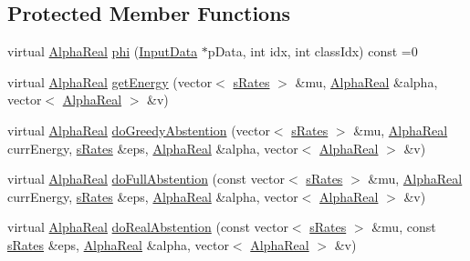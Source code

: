 \subsection*{Protected Member Functions}
\begin{DoxyCompactItemize}
\item 
virtual \hyperlink{Defaults_8h_a80184c4fd10ab70a1a17c5f97dcd1563}{Alpha\-Real} \hyperlink{classMultiBoost_1_1AbstainableLearner_a76d59e5c6678f43a3f483064beb06f64}{phi} (\hyperlink{classMultiBoost_1_1InputData}{Input\-Data} $\ast$p\-Data, int idx, int class\-Idx) const =0
\item 
virtual \hyperlink{Defaults_8h_a80184c4fd10ab70a1a17c5f97dcd1563}{Alpha\-Real} \hyperlink{classMultiBoost_1_1AbstainableLearner_ae0a99b6a9658f9dd66d55f3b47609675}{get\-Energy} (vector$<$ \hyperlink{structMultiBoost_1_1sRates}{s\-Rates} $>$ \&mu, \hyperlink{Defaults_8h_a80184c4fd10ab70a1a17c5f97dcd1563}{Alpha\-Real} \&alpha, vector$<$ \hyperlink{Defaults_8h_a80184c4fd10ab70a1a17c5f97dcd1563}{Alpha\-Real} $>$ \&v)
\item 
virtual \hyperlink{Defaults_8h_a80184c4fd10ab70a1a17c5f97dcd1563}{Alpha\-Real} \hyperlink{classMultiBoost_1_1AbstainableLearner_a022edc8c1b04c21720f56c0562db10a7}{do\-Greedy\-Abstention} (vector$<$ \hyperlink{structMultiBoost_1_1sRates}{s\-Rates} $>$ \&mu, \hyperlink{Defaults_8h_a80184c4fd10ab70a1a17c5f97dcd1563}{Alpha\-Real} curr\-Energy, \hyperlink{structMultiBoost_1_1sRates}{s\-Rates} \&eps, \hyperlink{Defaults_8h_a80184c4fd10ab70a1a17c5f97dcd1563}{Alpha\-Real} \&alpha, vector$<$ \hyperlink{Defaults_8h_a80184c4fd10ab70a1a17c5f97dcd1563}{Alpha\-Real} $>$ \&v)
\item 
virtual \hyperlink{Defaults_8h_a80184c4fd10ab70a1a17c5f97dcd1563}{Alpha\-Real} \hyperlink{classMultiBoost_1_1AbstainableLearner_a08b11f234d6f857343432a7f6c2d0c03}{do\-Full\-Abstention} (const vector$<$ \hyperlink{structMultiBoost_1_1sRates}{s\-Rates} $>$ \&mu, \hyperlink{Defaults_8h_a80184c4fd10ab70a1a17c5f97dcd1563}{Alpha\-Real} curr\-Energy, \hyperlink{structMultiBoost_1_1sRates}{s\-Rates} \&eps, \hyperlink{Defaults_8h_a80184c4fd10ab70a1a17c5f97dcd1563}{Alpha\-Real} \&alpha, vector$<$ \hyperlink{Defaults_8h_a80184c4fd10ab70a1a17c5f97dcd1563}{Alpha\-Real} $>$ \&v)
\item 
virtual \hyperlink{Defaults_8h_a80184c4fd10ab70a1a17c5f97dcd1563}{Alpha\-Real} \hyperlink{classMultiBoost_1_1AbstainableLearner_a04438bf3df3599fe42ca26771b6b2aff}{do\-Real\-Abstention} (const vector$<$ \hyperlink{structMultiBoost_1_1sRates}{s\-Rates} $>$ \&mu, const \hyperlink{structMultiBoost_1_1sRates}{s\-Rates} \&eps, \hyperlink{Defaults_8h_a80184c4fd10ab70a1a17c5f97dcd1563}{Alpha\-Real} \&alpha, vector$<$ \hyperlink{Defaults_8h_a80184c4fd10ab70a1a17c5f97dcd1563}{Alpha\-Real} $>$ \&v)

\end{DoxyCompactItemize}
